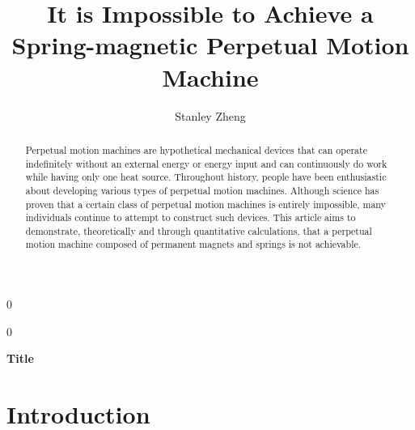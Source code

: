 \documentclass[12pt]{article}
\newcommand{\blind}{0}
\begin{document}

%

\def\spacingset#1{\renewcommand{\baselinestretch}%
{#1}\small\normalsize} \spacingset{1}



\blind
{
  \title{\bf It is Impossible to Achieve a Spring-magnetic Perpetual Motion Machine }
  \author{Stanley Zheng}
  \maketitle
} \fi

\blind
{
  \bigskip
  \bigskip
  \bigskip
  \begin{center}
    {\LARGE\bf Title}
\end{center}
  \medskip
} \fi

\bigskip
\begin{abstract}
Perpetual motion machines are hypothetical mechanical devices that can operate indefinitely without an external energy or energy input and can continuously do work while having only one heat source. Throughout history, people have been enthusiastic about developing various types of perpetual motion machines. Although science has proven that a certain class of perpetual motion machines is entirely impossible, many individuals continue to attempt to construct such devices. This article aims to demonstrate, theoretically and through quantitative calculations, that a perpetual motion machine composed of permanent magnets and springs is not achievable.
\end{abstract}


\spacingset{1.45}
\section{Introduction}
\label{sec:intro}
\end{document}
